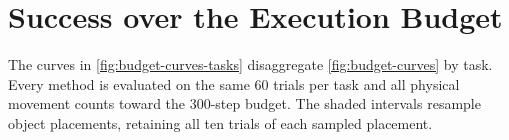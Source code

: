 \section{Success over the Execution Budget}
\label{app:budget-curves}

The curves in \cref{fig:budget-curves-tasks} disaggregate \cref{fig:budget-curves} by task. Every method is evaluated on the same 60 trials per task and all physical movement counts toward the 300-step budget. The shaded intervals resample object placements, retaining all ten trials of each sampled placement.

\clearpage

